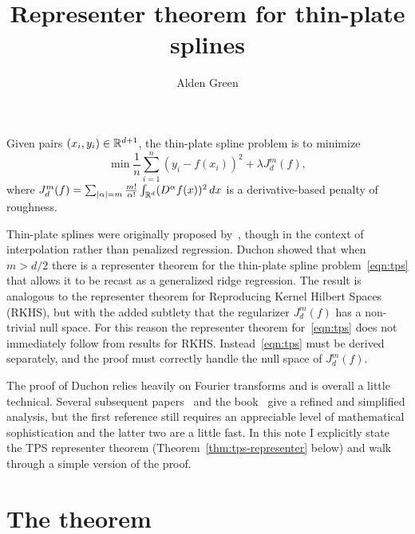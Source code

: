 \documentclass{article}
\begin{document}
	\title{{ \bf Representer theorem for thin-plate splines}}
	\author{Alden Green}
	\date{}
	\maketitle
	\RaggedRight
	
Given pairs $(x_i,y_i) \in \mathbb{R}^{d + 1}$, the thin-plate spline problem is to minimize
\begin{equation}
	\label{eqn:tps}
	\min \frac{1}{n}\sum_{i = 1}^{n}(y_i - f(x_i))^2 + \lambda J_d^{m}(f),
\end{equation}
where $J_d^{m}(f) = \sum_{|\alpha| = m} \frac{m!}{\alpha!} \int_{\mathbb{R}^d} (D^{\alpha}f(x))^2 \,dx$ is a derivative-based penalty of roughness.

Thin-plate splines were originally proposed by~\citet{duchon1977}, though in the context of interpolation rather than penalized regression. Duchon showed that when $m > d/2$ there is a representer theorem for the thin-plate spline problem~\eqref{eqn:tps} that allows it to be recast as a generalized ridge regression. The result is analogous to the representer theorem for Reproducing Kernel Hilbert Spaces (RKHS), but with the added subtlety that the regularizer $J_d^m(f)$ has a non-trivial null space. For this reason the representer theorem for~\eqref{eqn:tps} does not immediately follow from results for RKHS. Instead~\eqref{eqn:tps} must be derived separately, and the proof must correctly handle the null space of $J_d^m(f)$.

The proof of Duchon relies heavily on Fourier transforms and is overall a little technical. Several subsequent papers~\citet{meinguet1979,wendelburger1981} and the book~\citet{gu2013smoothing} give a refined and simplified analysis, but the first reference still requires an appreciable level of mathematical sophistication and the latter two are a little fast. In this note I explicitly state the TPS representer theorem (Theorem~\ref{thm:tps-representer} below) and walk through a simple version of the proof. 

\section{The theorem}
\end{document}
